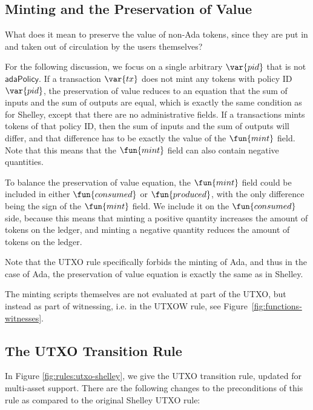 \subsection*{Minting and the Preservation of Value}
What does it mean to preserve the value of non-Ada tokens, since they
are put in and taken out of circulation by the users themselves?

For the following discussion, we focus on a single arbitrary
$\var{pid}$ that is not $\mathsf{adaPolicy}$. If a transaction $\var{tx}$
does not mint any tokens with policy ID $\var{pid}$, the preservation
of value reduces to an equation that the sum of inputs and the sum of
outputs are equal, which is exactly the same condition as for Shelley,
except that there are no administrative fields. If a transactions
mints tokens of that policy ID, then the sum of inputs and the sum of
outputs will differ, and that difference has to be exactly the value
of the $\fun{mint}$ field. Note that this means that the
$\fun{mint}$ field can also contain negative quantities.

To balance the preservation of value equation, the $\fun{mint}$ field
could be included in either $\fun{consumed}$ or $\fun{produced}$, with
the only difference being the sign of the $\fun{mint}$ field. We
include it on the $\fun{consumed}$ side, because this means that
minting a positive quantity increases the amount of tokens on the
ledger, and minting a negative quantity reduces the amount of tokens on
the ledger.

Note that the UTXO rule specifically forbids the minting of Ada, and
thus in the case of Ada, the preservation of value equation is exactly
the same as in Shelley.

The minting scripts themselves are not evaluated at part of the UTXO, but instead
as part of witnessing, i.e. in the UTXOW rule, see Figure~\ref{fig:functions-witnesses}.

\subsection*{The UTXO Transition Rule}
In Figure \ref{fig:rules:utxo-shelley}, we give the UTXO transition rule,
updated for multi-asset support. There are the following changes to the preconditions
of this rule as compared to the original Shelley UTXO rule:

